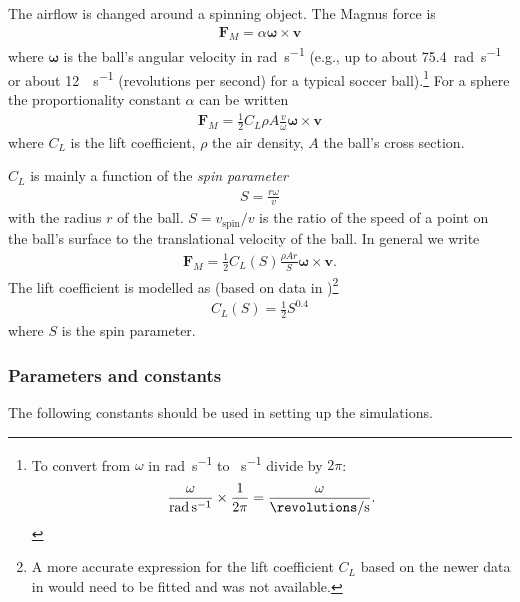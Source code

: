 \documentclass[letterpaper]{scrartcl}
\renewcommand{\vec}[1]{\ensuremath{\mathbf{#1}}}
\begin{document}
The airflow is changed around a spinning object. The Magnus force is
\begin{gather}
  \vec{F}_M = \alpha \boldsymbol{\omega} \times \vec{v}
  \label{eq:Fmagnus}
\end{gather}
where $\boldsymbol{\omega}$ is the ball's angular velocity in
\si{rad.s^{-1}} (e.g., up to about \SI{75.4}{rad.s^{-1}} or about
\SI{12}{\revolutions\per\second} (revolutions per second) for a
typical soccer ball).\footnote{To convert from $\omega$ in
  \si{rad.s^{-1}} to \si{\revolutions\per\second} divide by $2\pi$:
  \begin{gather*}
    \frac{\omega}{\si{rad.s^{-1}}} \times \frac{1}{2\pi} = %
    \frac{\omega}{\si{\revolutions\per\second}}.
  \end{gather*}
}
%
For a sphere the proportionality constant $\alpha$ can be written
\begin{gather}
  \label{eq:sphere}  
  \vec{F}_M = \frac{1}{2} C_L \rho A \frac{v}{\omega}
  \boldsymbol{\omega} \times \vec{v}
\end{gather}
where $C_L$ is the lift coefficient, $\rho$ the air density, $A$ the
ball's cross section.

$C_L$ is mainly a function of the \emph{spin parameter}
\begin{gather}
  \label{eq:S}
  S = \frac{r\omega}{v}
\end{gather}
with the radius $r$ of the ball. $S = v_{\text{spin}}/v$ is the ratio of the speed of a
point on the ball's surface to the translational velocity of the ball. In general we write
\begin{gather}
  \label{eq:FM}  
  \vec{F}_M = \frac{1}{2} C_L(S) \frac{\rho A r}{S}
  \boldsymbol{\omega} \times \vec{v}.
\end{gather}
The lift coefficient is modelled as \citep{Wang:2015aa} (based on data
in \citet{Goff:2009aa})\footnote{A more accurate expression for the
  lift coefficient $C_{L}$ based on the newer data in
  \citet{Goff:2010aa} would need to be fitted and was not available.}
\begin{gather}
  \label{eq:CL}
  C_{L}(S) = \frac{1}{2} S^{0.4}
\end{gather}
where $S$ is the spin parameter.


\subsubsection{Parameters and constants}

The following constants should be used in setting up the simulations.
\end{document}
